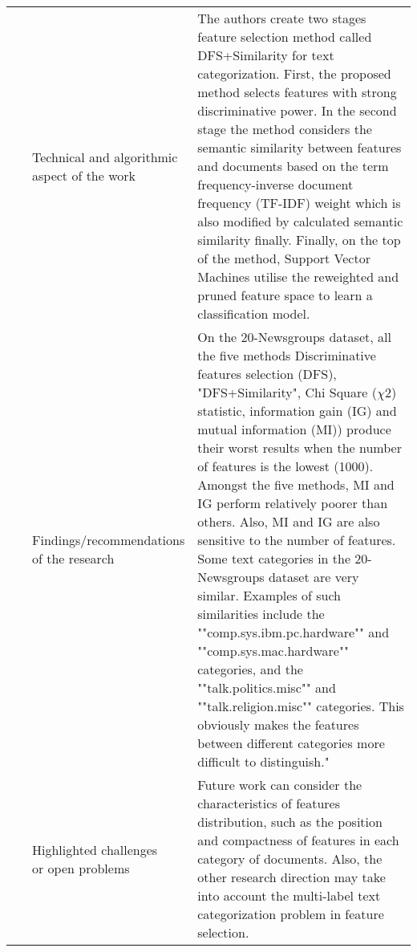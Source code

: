 \begin{landscape}
\begin{longtable}{lp{}p{}}
	\multirow{3}[0]{*}{~\citep{Zong2015}} & 
    \specialcell{Technical and algorithmic \\ aspect of the work} &
	The authors create two stages feature selection method called DFS+Similarity for text categorization. First, the proposed method selects features with strong discriminative power. In the second stage the method considers the semantic similarity between features and documents based on the term frequency-inverse document frequency (TF-IDF) weight which is also modified by calculated semantic similarity finally. Finally, on the top of the method, Support Vector Machines utilise the reweighted and pruned feature space to learn a classification model.    
    \\ & 
    \specialcell{Findings/recommendations \\ of the research} & 
	On the 20-Newsgroups dataset, all the five methods Discriminative features selection (DFS), "DFS+Similarity", Chi Square ($\chi2$) statistic, information gain (IG) and mutual information (MI)) produce their worst results when the number of features is the lowest (1000). Amongst the five methods, MI and IG perform relatively poorer than others. Also, MI and IG are also sensitive to the number of features. Some text categories in the 20-Newsgroups dataset are very similar. Examples of such similarities include the ""comp.sys.ibm.pc.hardware"" and ""comp.sys.mac.hardware"" categories, and the ""talk.politics.misc"" and ""talk.religion.misc"" categories. This obviously makes the features between different categories more difficult to distinguish."
    \\ & 
    \specialcell{Highlighted challenges \\ or open problems} & 
    Future work can consider the characteristics of features distribution, such as the position and compactness of features in each category of documents. Also, the other research direction may take into account the multi-label text categorization problem in feature selection.
	\\
	

\end{longtable}
\end{landscape}

